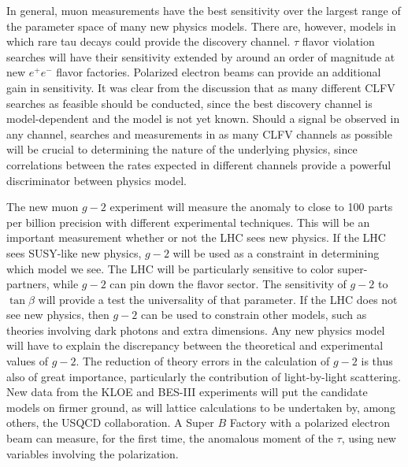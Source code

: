 In general, muon measurements have the best
sensitivity over the largest range of the parameter space of many new
physics models. There are, however, models
in which  rare tau decays could provide the discovery
channel. $\tau$ flavor violation searches will have their sensitivity extended by around an order of magnitude at new $e^+e^-$ flavor factories. Polarized electron beams can provide an additional gain in sensitivity.  It was clear from the discussion that as many different
CLFV searches as feasible should be conducted, since the best discovery
channel is model-dependent and the model is not yet known.  Should a
signal be observed in any channel, searches and measurements in as
many CLFV channels as possible will be crucial to determining the nature
of the underlying physics, since correlations between the rates
expected in different channels provide a powerful discriminator between
physics model.

The new muon $g\!\!-\!\!2$ experiment will measure the anomaly to close to 100 parts per billion precision
with different experimental techniques. This will be an important measurement whether or not the LHC sees new physics. If the LHC sees SUSY-like new physics, $g\!\!-\!\!2$ will be used as a constraint in determining which model we see. The LHC will be particularly sensitive to color super-partners, while $g\!\!-\!\!2$ can pin down the flavor sector. The sensitivity of $g\!\!-\!\!2$ to $\tan\beta$ will provide a test the universality of that parameter. If the LHC does not see new physics, then $g\!\!-\!\!2$ can be used to constrain other models, such as theories involving dark photons and extra dimensions. Any new physics model will have to explain the discrepancy between the theoretical and experimental values of $g\!\!-\!\!2$.
The reduction of theory errors in the calculation of $g\!\!-\!\!2$ is thus also of great importance, particularly the contribution of light-by-light scattering.  New data from the KLOE and BES-III experiments  will put the candidate models on firmer ground, as will lattice calculations to be undertaken by, among others, the USQCD collaboration. A Super $B$ Factory with a polarized electron beam can measure, for the first time, the anomalous moment of the $\tau$, using new variables involving the polarization.


